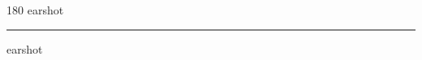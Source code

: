 
\begin{frame}
\begin{center}
\begin{turn}{180}
{\fontsize{2.5cm}{1em}\selectfont earshot}
\end{turn}
\vspace{1em}\par  
\hrule
\vspace{1em}\par  
{\fontsize{2.5cm}{1em}\selectfont earshot}
\end{center}
\end{frame}

